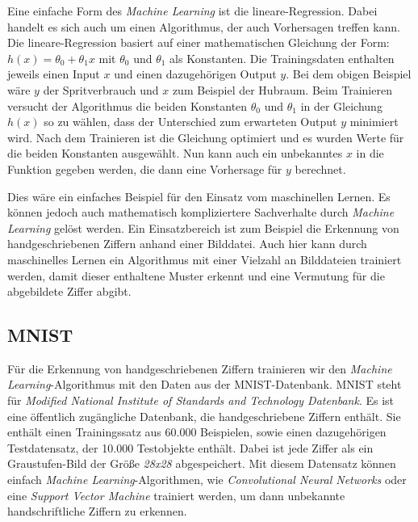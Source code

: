 Eine einfache Form des \textit{Machine Learning} ist die lineare-Regression. Dabei handelt es sich auch um einen Algorithmus, der auch Vorhersagen treffen kann.
Die lineare-Regression basiert auf einer mathematischen Gleichung der Form: $h(x) = \theta_0 + \theta_1x $ mit $\theta_0$ und $\theta_1$ als Konstanten.
Die Trainingsdaten enthalten jeweils einen Input $x$ und einen dazugehörigen Output $y$. Bei dem obigen Beispiel wäre $y$ der Spritverbrauch und $x$ zum Beispiel der
Hubraum. Beim Trainieren versucht der Algorithmus die beiden Konstanten $\theta_0$ und $\theta_1$ in der Gleichung $h(x)$ so zu wählen, 
dass der Unterschied zum erwarteten Output $y$ minimiert wird. Nach dem Trainieren ist die Gleichung optimiert und es wurden Werte für die beiden Konstanten ausgewählt.
Nun kann auch ein unbekanntes $x$ in die Funktion gegeben werden, die dann eine Vorhersage für $y$ berechnet.\cite{simon_2015}

Dies wäre ein einfaches Beispiel für den Einsatz vom maschinellen Lernen. Es können jedoch auch mathematisch kompliziertere Sachverhalte durch \textit{Machine Learning}
gelöst werden. Ein Einsatzbereich ist zum Beispiel die Erkennung von handgeschriebenen Ziffern anhand einer Bilddatei. Auch hier kann durch maschinelles Lernen ein
Algorithmus mit einer Vielzahl an Bilddateien trainiert werden, damit dieser enthaltene Muster erkennt und eine Vermutung für die abgebildete Ziffer abgibt. 

\subsection{MNIST}
Für die Erkennung von handgeschriebenen Ziffern trainieren wir den \textit{Machine Learning}-Algorithmus mit den Daten aus der MNIST-Datenbank.
MNIST steht für \textit{Modified National Institute of Standards and Technology Datenbank}. 
Es ist eine öffentlich zugängliche Datenbank, die handgeschriebene Ziffern enthält.
Sie enthält einen Trainingssatz aus 60.000 Beispielen, sowie einen dazugehörigen Testdatensatz, der 10.000 Testobjekte enthält.
Dabei ist jede Ziffer als ein Graustufen-Bild der Größe \textit{28x28} abgespeichert.
Mit diesem Datensatz können einfach \textit{Machine Learning}-Algorithmen, wie \textit{Convolutional Neural Networks} oder eine \textit{Support Vector Machine} trainiert
werden, um dann unbekannte handschriftliche Ziffern zu erkennen.

\newpage